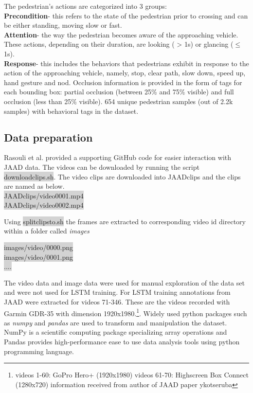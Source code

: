 The pedestrian's actions are categorized into 3 groups: \\
\textbf{Precondition}- this refers to the state of the pedestrian prior to crossing and can be either standing, moving slow or fast. \\
\textbf{Attention}- the way the pedestrian becomes aware of the approaching vehicle. These actions, depending on their duration, are looking ( > 1s) or glancing ($\leq$ 1s). \\
\textbf{Response}- this includes the behaviors that pedestrians exhibit in response
to the action of the approaching vehicle, namely, stop, clear path, slow down, speed up, hand gesture and nod.
Occlusion information is provided in the form of tags for each bounding box: partial occlusion (between 25\% and 75\% visible) and full occlusion (less than 25\% visible).  654 unique pedestrian samples (out of 2.2k samples) with behavioral tags in the dataset. 

\subsection{Data preparation}
\cite{rasouli2017agreeing} Rasouli et al. provided a supporting GitHub code for easier interaction with JAAD data. The videos can be downloaded by running the script \colorbox{lightgray}{download\textunderscore clips.sh}. The video clips are downloaded into JAAD\textunderscore clips and the clips are named as below.\\
\colorbox{lightgray} {JAAD\textunderscore clips/video\textunderscore  0001.mp4} \\
\colorbox{lightgray} {JAAD\textunderscore clips/video\textunderscore  0002.mp4}

Using \colorbox{lightgray}{split\textunderscore clips\textunderscore to\textunderscore .sh} the frames are extracted to corresponding video id directory within a folder called \textit{images} \\
\begin{center}
\colorbox{lightgray} {images/video/0000.png} \\
\colorbox{lightgray} {images/video/0001.png} \\
\colorbox{lightgray} {....}
\end{center}

The video data and image data were used for manual exploration of the data set and were not used for LSTM training. For LSTM training annotations from JAAD were extracted for videos 71-346. These are the videos recorded with Garmin GDR-35 with dimension 1920x1980.\footnote{videos 1-60: GoPro Hero+ (1920x1980)
videos 61-70: Highscreen Box Connect (1280x720) information received from author of JAAD paper ykotseruba}. Widely used python packages such as \textit{numpy }and \textit{pandas} are used to transform and manipulation the dataset. NumPy is a scientific computing package specializing array operations and Pandas provides high-performance ease to use data analysis tools using python programming language.  \\

